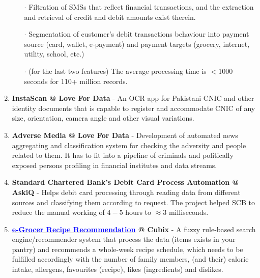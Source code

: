 \documentclass[10pt]{article}
\begin{document}
\begin{enumerate}
\begin{itemize}
\item[$\boldsymbol{\cdot}$] Filtration of SMSs that reflect financial transactions, and the {extraction and retrieval of credit and debit amounts} exist therein.

\item[$\boldsymbol{\cdot}$] Segmentation of {customer's debit transactions behaviour into payment source} (card, wallet, e-payment) and {payment targets} (grocery, internet, utility, school, etc.)

\item[$\boldsymbol{\cdot}$] (for the last two features) The average processing time is $<$1000 seconds for 110+ million records.
\end{itemize}

\item \textbf{InstaScan @ Love For Data} - An OCR app for Pakistani CNIC and other identity documents that is capable to register and accommodate CNIC of any size, orientation, camera angle and other visual variations.

\item \textbf{ Adverse Media @ Love For Data} - Development of automated news aggregating and classification system for checking the adversity and people related to them. It has to fit into a pipeline of criminals and politically exposed persons profiling in financial institutes and data streams.

\item \textbf{Standard Chartered Bank's Debit Card Process Automation @ AskiQ} - Helps debit card processing through reading data from different sources and classifying them according to request. The project helped SCB to reduce the manual working of $4\!-\!5$ hours to $\approx\!3$ milliseconds.

\item \textbf{ \href{https://play.google.com/store/apps/details?id=com.egrocer&hl=en&gl=US}{\textcolor{blue}{e-Grocer Recipe Recommendation}} @ Cubix} - A fuzzy rule-based search engine/recommender system that process the data (items exists in your pantry) and recommends a whole-week recipe schedule, which needs to be fulfilled accordingly with the number of family members, (and their) calorie intake, allergens, favourites (recipe), likes (ingredients) and dislikes.



\end{enumerate}
\end{document}
